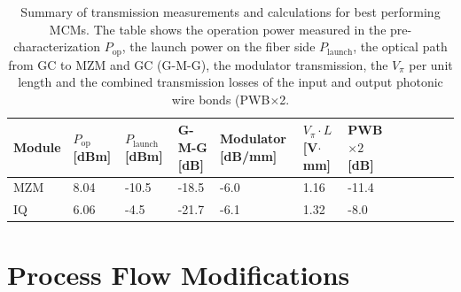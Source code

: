 \begin{table}[]
\centering
\begin{tabular}{@{}L{2cm}L{1.0cm}L{1.5cm}L{2cm}L{2cm}L{2cm}L{2cm}L{2cm}L{2cm}L{2cm}L{2cm}L{2cm}@{}}
\toprule
Module   & $P_\text{op}$ [dBm] & $P_\text{launch}$ [dBm] & G-M-G [dB]  & Modulator [dB/mm] & $V_\pi \cdot L$ [V$\cdot$mm] & PWB$\times 2$ [dB] \\ \midrule
MZM    & 8.04  & -10.5     &        -18.5    & -6.0 & 1.16 &  -11.4  \\
IQ     & 6.06  & -4.5      &       -21.7      & -6.1 & 1.32 &  -8.0  \\ \bottomrule
\end{tabular}
\caption{Summary of transmission measurements and calculations for best performing MCMs. The table shows the operation power measured in the pre-characterization $P_\text{op}$, the launch power on the fiber side $P_\text{launch}$, the optical path from GC to MZM and GC (G-M-G), the modulator transmission, the $V_\pi$ per unit length and the combined transmission losses of the input and output photonic wire bonds (PWB$\times$2.}
\label{tab:IL}
\end{table}


\section{Process Flow Modifications}
\label{sec:Evaluation:mfg}



